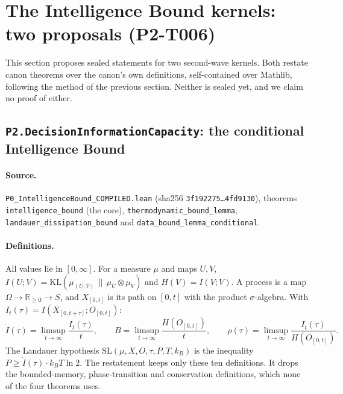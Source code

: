 \documentclass[11pt]{article}
\theoremstyle{definition}
\theoremstyle{remark}
\begin{document}
\section{The Intelligence Bound kernels: two proposals (P2-T006)}\label{sec:ib}
This section proposes sealed statements for two second-wave kernels. Both restate canon theorems over the canon's own
definitions, self-contained over Mathlib, following the method of the previous section. Neither is sealed yet, and we claim no
proof of either.

\subsection{\texttt{P2.DecisionInformationCapacity}: the conditional Intelligence Bound}
\paragraph{Source.} \texttt{P0\_IntelligenceBound\_COMPILED.lean} (sha256 \texttt{3f192275\ldots 4fd9130}), theorems
\texttt{intelligence\_bound} (the core), \texttt{thermodynamic\_bound\_lemma}, \texttt{landauer\_dissipation\_bound} and
\texttt{data\_bound\_lemma\_conditional}.

\paragraph{Definitions.} All values lie in $[0,\infty]$. For a measure $\mu$ and maps $U,V$,
$I(U;V)=\mathrm{KL}(\mu_{(U,V)}\,\|\,\mu_U\otimes\mu_V)$ and $H(V)=I(V;V)$. A process is a map $\Omega\to\mathbb{R}_{\ge0}\to S$,
and $X_{[0,t]}$ is its path on $[0,t]$ with the product $\sigma$-algebra. With $I_t(\tau)=I(X_{[0,t+\tau]};O_{[0,t]})$:
\[
\dot I(\tau)=\limsup_{t\to\infty}\frac{I_t(\tau)}{t},\qquad
B=\limsup_{t\to\infty}\frac{H(O_{[0,t]})}{t},\qquad
\rho(\tau)=\limsup_{t\to\infty}\frac{I_t(\tau)}{H(O_{[0,t]})}.
\]
The Landauer hypothesis $\mathrm{SL}(\mu,X,O,\tau,P,T,k_B)$ is the inequality $P\ge \dot I(\tau)\cdot k_BT\ln2$.
The restatement keeps only these ten definitions. It drops the bounded-memory, phase-transition and conservation
definitions, which none of the four theorems uses.
\end{document}
